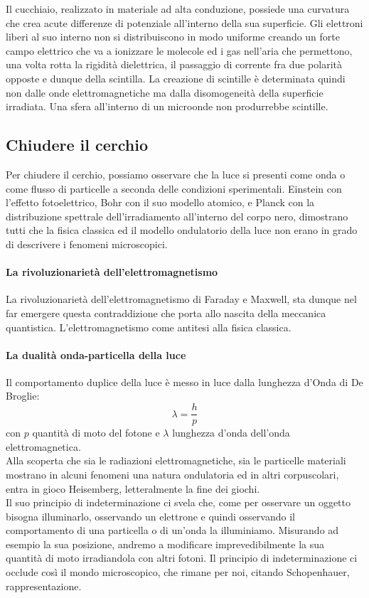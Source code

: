 \documentclass{article}
\begin{document}
Il cucchiaio, realizzato in materiale ad alta conduzione, possiede una curvatura che crea acute differenze di potenziale all'interno della sua superficie. Gli elettroni liberi al suo interno non si distribuiscono in modo uniforme creando un forte campo elettrico che va a ionizzare le molecole ed i gas nell'aria che permettono, una volta rotta la rigidità dielettrica, il passaggio di corrente fra due polarità opposte e dunque della scintilla.
La creazione di scintille è determinata quindi non dalle onde elettromagnetiche ma dalla disomogeneità della superficie irradiata. Una sfera all'interno di un microonde non produrrebbe scintille.
\subsection{Chiudere il cerchio} 
Per chiudere il cerchio, possiamo osservare che la luce si presenti come onda o come flusso di particelle a seconda delle condizioni sperimentali. Einstein con l'effetto fotoelettrico, Bohr con il suo modello atomico, e Planck con la distribuzione spettrale dell'irradiamento all'interno del corpo nero, dimostrano tutti che la fisica classica ed il modello ondulatorio della luce non erano in grado di descrivere i fenomeni microscopici. 
\paragraph{La rivoluzionarietà dell'elettromagnetismo} La rivoluzionarietà dell'elettromagnetismo di Faraday e Maxwell, sta dunque nel far emergere questa contraddizione che porta allo nascita della meccanica quantistica. L'elettromagnetismo come antitesi alla fisica classica.
\paragraph{La dualità onda-particella della luce} Il comportamento duplice della luce è messo in luce dalla lunghezza d'Onda di De Broglie:
\[ \lambda = \frac{h}{p}\]
con $p$ quantità di moto del fotone e $\lambda$ lunghezza d'onda dell'onda elettromagnetica.\\

Alla scoperta che sia le radiazioni elettromagnetiche, sia le particelle materiali mostrano in alcuni fenomeni una natura ondulatoria ed in altri corpuscolari, entra in gioco Heisemberg, letteralmente la fine dei giochi.\\

Il suo principio di indeterminazione ci svela che, come per osservare un oggetto bisogna illuminarlo, osservando un elettrone e quindi osservando il comportamento di una particella o di un'onda la illuminiamo. Misurando ad esempio la sua posizione, andremo a modificare imprevedibilmente la sua quantità di moto irradiandola con altri fotoni. Il principio di indeterminazione ci occlude così il mondo microscopico, che rimane per noi, citando Schopenhauer, rappresentazione.
\newpage
\end{document}
